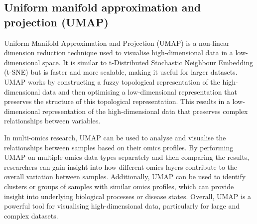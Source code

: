 \documentclass[
]{book}
\newenvironment{Shaded}{\begin{snugshade}}{\end{snugshade}}
\newcommand{\AttributeTok}[1]{\textcolor[rgb]{0.77,0.63,0.00}{#1}}
\newcommand{\CommentTok}[1]{\textcolor[rgb]{0.56,0.35,0.01}{\textit{#1}}}
\newcommand{\DecValTok}[1]{\textcolor[rgb]{0.00,0.00,0.81}{#1}}
\newcommand{\FunctionTok}[1]{\textcolor[rgb]{0.00,0.00,0.00}{#1}}
\newcommand{\NormalTok}[1]{#1}
\newcommand{\OtherTok}[1]{\textcolor[rgb]{0.56,0.35,0.01}{#1}}
\newcommand{\SpecialCharTok}[1]{\textcolor[rgb]{0.00,0.00,0.00}{#1}}
\newcommand{\StringTok}[1]{\textcolor[rgb]{0.31,0.60,0.02}{#1}}
\begin{document}
\hypertarget{umap}{%
\subsection{Uniform manifold approximation and projection (UMAP)}\label{umap}}

Uniform Manifold Approximation and Projection (UMAP) is a non-linear dimension reduction technique used to visualise high-dimensional data in a low-dimensional space. It is similar to t-Distributed Stochastic Neighbour Embedding (t-SNE) but is faster and more scalable, making it useful for larger datasets. UMAP works by constructing a fuzzy topological representation of the high-dimensional data and then optimising a low-dimensional representation that preserves the structure of this topological representation. This results in a low-dimensional representation of the high-dimensional data that preserves complex relationships between variables.

In multi-omics research, UMAP can be used to analyse and visualise the relationships between samples based on their omics profiles. By performing UMAP on multiple omics data types separately and then comparing the results, researchers can gain insight into how different omics layers contribute to the overall variation between samples. Additionally, UMAP can be used to identify clusters or groups of samples with similar omics profiles, which can provide insight into underlying biological processes or disease states. Overall, UMAP is a powerful tool for visualising high-dimensional data, particularly for large and complex datasets.

\begin{Shaded}
\end{Shaded}
\end{document}

